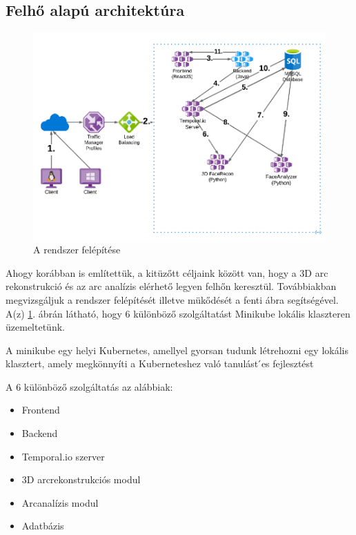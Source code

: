 \documentclass[12pt,a4]{article}
\begin{document}
	\subsection{Felhő alapú architektúra}
	
	\begin{figure}[h]	
		\centering
		\includegraphics[width=1\linewidth]{sysplan}
		\caption{ A rendszer felépítése}
	   \label{fig:sysplan}
    \end{figure}

	Ahogy korábban is említettük, a kitüzőtt céljaink között van, hogy a
	3D arc rekonstrukció és az arc analízis elérhető legyen felhőn keresztül.
	Továbbiakban megvizsgáljuk a rendszer felépítését illetve mükődését a
	fenti ábra segítségével. A(z) \ref{fig:sysplan}. ábrán látható, hogy 6 különböző szolgáltatást
	Minikube lokális klaszteren üzemeltetünk.

    \newpage
	\begin{mdframed}
		A minikube egy helyi Kubernetes, amellyel gyorsan tudunk létrehozni
		egy lokális klasztert, amely megkönnyíti a Kuberneteshez való tanulást
		́es fejlesztést
	\end{mdframed}

	A 6 különböző szolgáltatás az alábbiak:
	\begin{itemize}
		\item Frontend
		\item Backend
		\item Temporal.io szerver
		\item 3D arcrekonstrukciós modul
		\item Arcanalízis modul
		\item Adatbázis
	\end{itemize}
\end{document}

